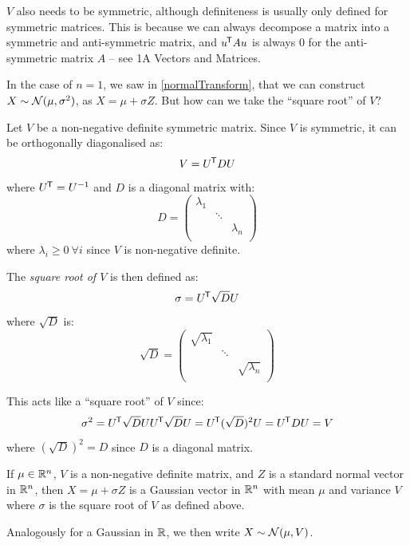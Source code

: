 \documentclass[../main.tex]{subfiles}
\begin{document}
\begin{remark}
  $V$ also needs to be symmetric, although definiteness is usually only defined for symmetric matrices.
  This is because we can always decompose a matrix into a symmetric and anti-symmetric matrix, and $u^{{\mkern-1.5mu\mathsf{T}}}Au$ is always 0 for the anti-symmetric matrix $A$ -- see 1A Vectors and Matrices.
\end{remark}
In the case of $n = 1$, we saw in \cref{normalTransform}, that we can construct $X \sim \operatorname{\mathcal{N}}(\mu, \sigma^2)$, as $X = \mu + \sigma Z$.
But how can we take the ``square root'' of $V$?
\begin{definition}
  Let $V$ be a non-negative definite symmetric matrix.
  Since $V$ is symmetric, it can be orthogonally diagonalised as:
  \[
    V = U^{{\mkern-1.5mu\mathsf{T}}} D U
  \]
  where $U^{{\mkern-1.5mu\mathsf{T}}} = U^{-1}$ and $D$ is a diagonal matrix with:
  \[
    D = \begin{pmatrix}
    \lambda_1 &  &  \\
     & \ddots &  \\
     &  & \lambda_n \\
    \end{pmatrix}
  \]
  where $\lambda_i \geq 0\ \forall i$ since $V$ is non-negative definite.

  The \textit{square root of $V$} is then defined as:
  \[
    \sigma = U^{{\mkern-1.5mu\mathsf{T}}} \sqrt{D} U
  \]
  where $\sqrt{D}$ is:
  \[
    \sqrt{D} = \begin{pmatrix}
    \sqrt{\lambda_1} &  &  \\
     & \ddots &  \\
     &  & \sqrt{\lambda_n} \\
    \end{pmatrix}
  \]
\end{definition}
\begin{remark}[Note]
  This acts like a ``square root'' of $V$ since:
  \[
    \sigma^2 = U^{{\mkern-1.5mu\mathsf{T}}} \sqrt{D} U U^{{\mkern-1.5mu\mathsf{T}}} \sqrt{D}U = U^{{\mkern-1.5mu\mathsf{T}}} (\sqrt{D})^2 U = U^{{\mkern-1.5mu\mathsf{T}}} DU = V
  \]
  where $(\sqrt{D})^2 = D$ since $D$ is a diagonal matrix.
\end{remark}
\begin{lemma}
  If $\mu \in \mathbb{R}^{n}$, $V$ is a non-negative definite matrix, and $Z$ is a standard normal vector in $\mathbb{R}^{n}$, then $X = \mu + \sigma Z$ is a Gaussian vector in $\mathbb{R}^{n}$ with mean $\mu$ and variance $V$ where $\sigma$ is the square root of $V$ as defined above. \label{gaussianConstruct}
\end{lemma}
\begin{remark}[Notation]
  Analogously for a Gaussian in $\mathbb{R}$, we then write $X \sim \operatorname{\mathcal{N}}(\mu, V)$.
\end{remark}
\end{document}
